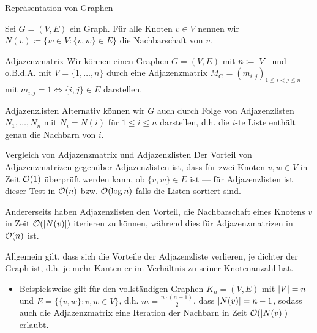 \begin{frame}{Repr\"asentation von Graphen}
\begin{definition}
Sei $G = (V, E)$ ein Graph.
F\"ur alle Knoten $v \in V$ nennen wir $N(v) \coloneqq \{ w \in V : \{v, w\} \in E \}$ die \alert{Nachbarschaft} von $v$.
\end{definition}

\begin{block}{Adjazenzmatrix}
Wir k\"onnen einen Graphen $G = (V, E)$ mit $n \coloneqq \vert V\vert$ und o.B.d.A. mit $V = \{ 1, \dots, n \}$ durch eine \alert{Adjazenzmatrix} $M_G = (m_{i,j})_{1 \leq i < j \leq n}$ mit $m_{i, j} = 1 \iff \{ i, j \} \in E$ darstellen.
\end{block}

\begin{block}{Adjazenzlisten}
Alternativ k\"onnen wir $G$ auch durch Folge von \alert{Adjazenzlisten} $N_1, \dots, N_n$ mit $N_i = N(i)$ f\"ur $1 \leq i \leq n$ darstellen, d.h. die $i$-te Liste enth\"alt genau die Nachbarn von $i$.
\end{block}
\end{frame}

\begin{frame}{Vergleich von Adjazenzmatrix und Adjazenzlisten}
Der Vorteil von Adjazenzmatrizen gegen\"uber Adjazenzlisten ist, dass f\"ur zwei Knoten $v, w \in V$ in Zeit $\mathcal{O}(1)$ \"uberpr\"uft werden kann, ob $\{ v, w \} \in E$ ist --- f\"ur Adjazenzlisten ist dieser Test in $\mathcal{O}(n)$ bzw. $\mathcal{O}(\log n)$ falls die Listen sortiert sind.

Andererseits haben Adjazenzlisten den Vorteil, die Nachbarschaft eines Knotens $v$ in Zeit $\mathcal{O}(\vert N(v)\vert)$ iterieren zu k\"onnen, w\"ahrend dies f\"ur Adjazenzmatrizen in $\mathcal{O}(n)$ ist.

Allgemein gilt, dass sich die Vorteile der Adjazenzliste verlieren, je \alert{dichter} der Graph ist, d.h. je mehr Kanten er im Verh\"altnis zu seiner Knotenanzahl hat.
\begin{itemize}
    \item Beispielsweise gilt f\"ur den \alert{vollst\"andigen Graphen} $K_n = (V, E)$ mit $\vert V\vert = n$ und $E = \{ \{ v, w \} : v, w \in V \}$, d.h. $m = \frac{n \cdot (n-1)}{2}$, dass $\vert N(v)\vert = n - 1$, sodass auch die Adjazenzmatrix eine Iteration der Nachbarn in Zeit $\mathcal{O}(\vert N(v)\vert)$ erlaubt.
\end{itemize}
\end{frame}

